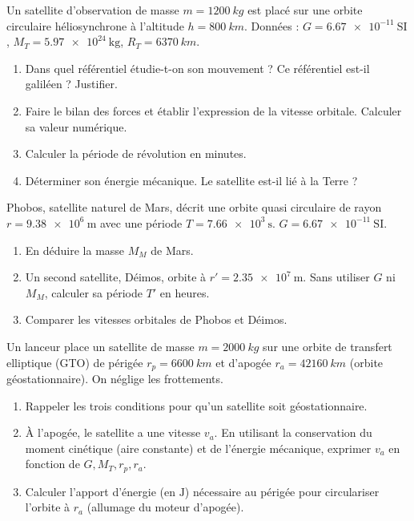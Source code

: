 \documentclass[11pt]{article}
\begin{document}
\begin{exercice}
Un satellite d'observation de masse $m = \SI{1200}{kg}$ est placé sur une orbite circulaire héliosynchrone à l'altitude $h = \SI{800}{km}$. Données : $G = \num{6,67e-11}\ \mathrm{SI}$, $M_T = \num{5,97e24}\ \mathrm{kg}$, $R_T = \SI{6370}{km}$.
\begin{enumerate}
\item Dans quel référentiel étudie-t-on son mouvement ? Ce référentiel est-il galiléen ? Justifier.
\item Faire le bilan des forces et établir l'expression de la vitesse orbitale. Calculer sa valeur numérique.
\item Calculer la période de révolution en minutes.
\item Déterminer son énergie mécanique. Le satellite est-il lié à la Terre ?
\end{enumerate}
\end{exercice}

\begin{exercice}
Phobos, satellite naturel de Mars, décrit une orbite quasi circulaire de rayon $r = \num{9,38e6}\ \mathrm{m}$ avec une période $T = \num{7,66e3}\ \mathrm{s}$. $G = \num{6,67e-11}\ \mathrm{SI}$.
\begin{enumerate}
\item En déduire la masse $M_M$ de Mars.
\item Un second satellite, Déimos, orbite à $r' = \num{2,35e7}\ \mathrm{m}$. Sans utiliser $G$ ni $M_M$, calculer sa période $T'$ en heures.
\item Comparer les vitesses orbitales de Phobos et Déimos.
\end{enumerate}
\end{exercice}

\begin{exercice}
Un lanceur place un satellite de masse $m = \SI{2000}{kg}$ sur une orbite de transfert elliptique (GTO) de périgée $r_p = \SI{6600}{km}$ et d'apogée $r_a = \SI{42160}{km}$ (orbite géostationnaire). On néglige les frottements.
\begin{enumerate}
\item Rappeler les trois conditions pour qu'un satellite soit géostationnaire.
\item À l'apogée, le satellite a une vitesse $v_a$. En utilisant la conservation du moment cinétique (aire constante) et de l'énergie mécanique, exprimer $v_a$ en fonction de $G, M_T, r_p, r_a$.
\item Calculer l'apport d'énergie (en $\mathrm{J}$) nécessaire au périgée pour circulariser l'orbite à $r_a$ (allumage du moteur d'apogée).
\end{enumerate}
\end{exercice}
\end{document}
